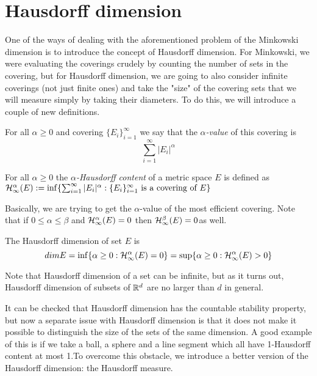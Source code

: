 \documentclass{article}
\begin{document}
\section{Hausdorff dimension}
One of the ways of dealing with the aforementioned problem of the Minkowski dimension is to introduce the concept of Hausdorff dimension. For Minkowski, we were evaluating the coverings crudely by counting the number of sets in the covering, but for Hausdorff dimension, we are going to also consider infinite coverings (not just finite ones) and take the "size" of the covering sets that we will measure simply by taking their diameters. To do this, we will introduce a couple of new definitions.\cite{morters_peres_2010}

\begin{definition}
For all $\alpha\geq 0 $ and covering $\{E_i\}_{i=1}^\infty$ we say that the \textit{$\alpha$-value} of this covering is 
$$\sum_{i=1}^{\infty}|E_i|^{\alpha} $$
\end{definition}

\begin{definition}
For all $ \alpha\geq 0$ the \textit{$\alpha$-Hausdorff content} of a metric space $E$ is defined as 
$\mathcal{H}_{\infty}^{\alpha}(E):=\inf\{\sum_{i=1}^{\infty}|E_i|^{\alpha}: \{E_i\}_{i=1}^{\infty} \text{ is a covering of } E\} $
\end{definition}
Basically, we are trying to get the $\alpha$-value of the most efficient covering. Note that if $0\leq \alpha \leq \beta$ and $\mathcal{H}_{\infty}^{\alpha}(E)=0$ then $\mathcal{H}_{\infty}^{\beta}(E)=0$as well. 

\begin{definition}
The Hausdorff dimension of set $E$ is 
$$dim E=\inf\{\alpha\geq 0:\mathcal{H}_{\infty}^{\alpha}(E)=0\}= \sup\{\alpha\geq 0:\mathcal{H}_{\infty}^{\alpha}(E)>0\}$$
\end{definition}
Note that Hausdorff dimension of a set can be infinite, but as it turns out, Hausdorff dimension of subsets of $\mathbb{R}^d$ are no larger than $d$ in general.



It can be checked that Hausdorff dimension has the countable stability property, but now a separate issue with Hausdorff dimension is that it does not make it possible to distinguish the size of the sets of the same dimension. A good example of this is if we take a ball, a sphere and a line segment which all have 1-Hausdorff content at most 1.To overcome this obstacle, we introduce a better version of the Hausdorff dimension: the Hausdorff measure. 
\end{document}
